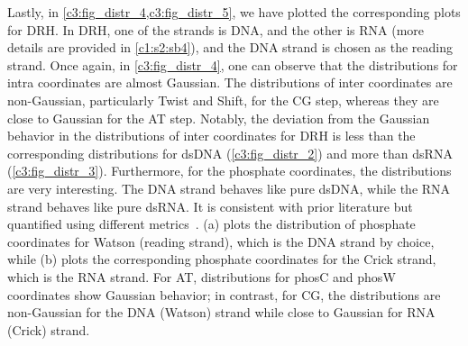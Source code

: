 Lastly, in \cref{c3:fig_distr_4,c3:fig_distr_5}, we have plotted the corresponding plots for DRH.
In DRH, one of the strands is DNA, and the other is RNA (more details are provided in \cref{c1:s2:sb4}), and the DNA strand is chosen as the reading strand.
Once again, in \cref{c3:fig_distr_4}, one can observe that the distributions for intra coordinates are almost Gaussian.  
The distributions of inter coordinates are non-Gaussian, particularly Twist and Shift, for the CG step, whereas they are close to Gaussian for the AT step.
Notably, the deviation from the Gaussian behavior in the distributions of inter coordinates for DRH is less than the corresponding distributions for dsDNA (\cref{c3:fig_distr_2}) and more than dsRNA (\cref{c3:fig_distr_3}).
Furthermore, for the phosphate coordinates, the distributions are very interesting. 
The DNA strand behaves like pure dsDNA, while the RNA strand behaves like pure dsRNA.
It is consistent with prior literature but quantified using different metrics~\cite{noy2008theoretical,noy2005structure,suresh2014dna}.
(a) plots the distribution of phosphate coordinates for Watson (reading strand), which is the DNA strand by choice, while (b) plots the corresponding phosphate coordinates for the Crick strand, which is the RNA strand. 
For AT, distributions for phosC and phosW coordinates show Gaussian behavior; in contrast, for CG, the distributions are non-Gaussian for the DNA (Watson) strand while close to Gaussian for RNA (Crick) strand.

